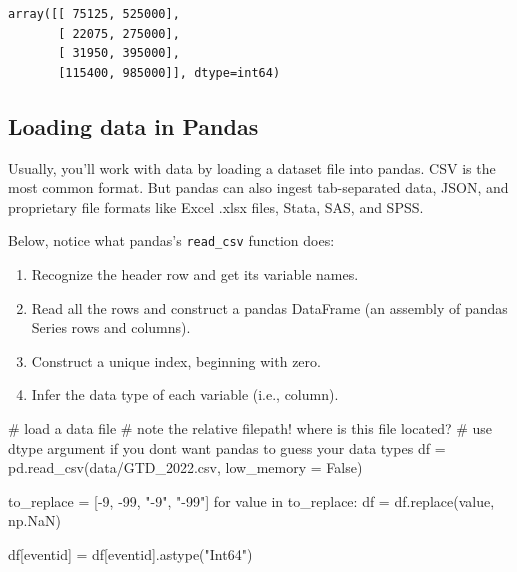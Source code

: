 \documentclass[
  letterpaper,
  DIV=11,
  numbers=noendperiod]{scrreprt}
\newenvironment{Shaded}{\begin{snugshade}}{\end{snugshade}}
\newcommand{\CommentTok}[1]{\textcolor[rgb]{0.37,0.37,0.37}{#1}}
\newcommand{\ControlFlowTok}[1]{\textcolor[rgb]{0.00,0.23,0.31}{#1}}
\newcommand{\DecValTok}[1]{\textcolor[rgb]{0.68,0.00,0.00}{#1}}
\newcommand{\KeywordTok}[1]{\textcolor[rgb]{0.00,0.23,0.31}{#1}}
\newcommand{\NormalTok}[1]{\textcolor[rgb]{0.00,0.23,0.31}{#1}}
\newcommand{\OperatorTok}[1]{\textcolor[rgb]{0.37,0.37,0.37}{#1}}
\newcommand{\StringTok}[1]{\textcolor[rgb]{0.13,0.47,0.30}{#1}}
\newcommand{\VariableTok}[1]{\textcolor[rgb]{0.07,0.07,0.07}{#1}}
\providecommand{\tightlist}{%
  \setlength{\itemsep}{0pt}\setlength{\parskip}{0pt}}\usepackage{longtable,booktabs,array}
\begin{document}
\begin{verbatim}
array([[ 75125, 525000],
       [ 22075, 275000],
       [ 31950, 395000],
       [115400, 985000]], dtype=int64)
\end{verbatim}

\subsection{Loading data in Pandas}\label{loading-data-in-pandas}

Usually, you'll work with data by loading a dataset file into pandas.
CSV is the most common format. But pandas can also ingest tab-separated
data, JSON, and proprietary file formats like Excel .xlsx files, Stata,
SAS, and SPSS.

Below, notice what pandas's \texttt{read\_csv} function does:

\begin{enumerate}
\def\labelenumi{\arabic{enumi}.}
\tightlist
\item
  Recognize the header row and get its variable names.
\item
  Read all the rows and construct a pandas DataFrame (an assembly of
  pandas Series rows and columns).
\item
  Construct a unique index, beginning with zero.
\item
  Infer the data type of each variable (i.e., column).
\end{enumerate}

\begin{Shaded}
\begin{Highlighting}[]
\CommentTok{\# load a data file}
\CommentTok{\# note the relative filepath! where is this file located?}
\CommentTok{\# use dtype argument if you don\textquotesingle{}t want pandas to guess your data types}
\NormalTok{df }\OperatorTok{=}\NormalTok{ pd.read\_csv(}\StringTok{\textquotesingle{}data/GTD\_2022.csv\textquotesingle{}}\NormalTok{, low\_memory }\OperatorTok{=} \VariableTok{False}\NormalTok{)}
\end{Highlighting}
\end{Shaded}

\begin{Shaded}
\begin{Highlighting}[]
\NormalTok{to\_replace }\OperatorTok{=}\NormalTok{ [}\OperatorTok{{-}}\DecValTok{9}\NormalTok{, }\OperatorTok{{-}}\DecValTok{99}\NormalTok{, }\StringTok{"{-}9"}\NormalTok{, }\StringTok{"{-}99"}\NormalTok{]}
\ControlFlowTok{for}\NormalTok{ value }\KeywordTok{in}\NormalTok{ to\_replace:}
\NormalTok{    df }\OperatorTok{=}\NormalTok{ df.replace(value, np.NaN)}

\NormalTok{df[}\StringTok{\textquotesingle{}eventid\textquotesingle{}}\NormalTok{] }\OperatorTok{=}\NormalTok{ df[}\StringTok{\textquotesingle{}eventid\textquotesingle{}}\NormalTok{].astype(}\StringTok{"Int64"}\NormalTok{)}
\end{Highlighting}
\end{Shaded}
\end{document}
